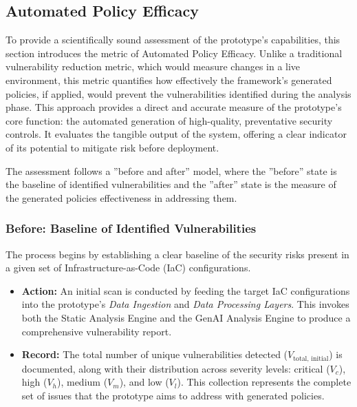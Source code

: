 \subsection{Automated Policy Efficacy}
\label{sec:automated-policy-efficacy}

To provide a scientifically sound assessment of the prototype's capabilities, this section introduces the metric of Automated Policy Efficacy. Unlike a traditional vulnerability reduction metric, which would measure changes in a live environment, this metric quantifies how effectively the framework's generated policies, if applied, would prevent the vulnerabilities identified during the analysis phase. This approach provides a direct and accurate measure of the prototype's core function: the automated generation of high-quality, preventative security controls. It evaluates the tangible output of the system, offering a clear indicator of its potential to mitigate risk before deployment.

The assessment follows a ''before and after'' model, where the ''before'' state is the baseline of identified vulnerabilities and the ''after'' state is the measure of the generated policies effectiveness in addressing them.

\subsubsection*{Before: Baseline of Identified Vulnerabilities}
The process begins by establishing a clear baseline of the security risks present in a given set of Infrastructure-as-Code (IaC) configurations.
 
\begin{itemize}
    \item \textbf{Action:} An initial scan is conducted by feeding the target IaC configurations into the prototype's \textit{Data Ingestion} and \textit{Data Processing Layers}. This invokes both the Static Analysis Engine and the GenAI Analysis Engine to produce a comprehensive vulnerability report.
    \item \textbf{Record:} The total number of unique vulnerabilities detected ($V_{\text{total, initial}}$) is documented, along with their distribution across severity levels: critical ($V_c$), high ($V_h$), medium ($V_m$), and low ($V_l$). This collection represents the complete set of issues that the prototype aims to address with generated policies.
\end{itemize}


